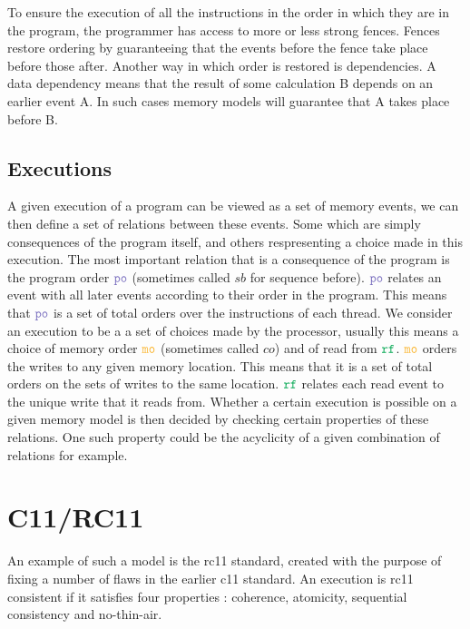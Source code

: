 \documentclass[a4,11pt,dvipsnames]{article}
\begin{document}
To ensure the execution of all the instructions in the order in which they are in the program, the programmer has access to more or less strong fences. Fences restore ordering by guaranteeing that the events before the fence take place before those after. Another way in which order is restored is dependencies. A data dependency means that the result of some calculation B depends on an earlier event A. In such cases memory models will guarantee that A takes place before B.%

\subsection{Executions}

A given execution of a program can be viewed as a set of memory events, we can then define a set of relations between these events. Some which are simply consequences of the program itself, and others respresenting a choice made in this execution. The most important relation that is a consequence of the program is the program order $\po$ (sometimes called $sb$ for sequence before). $\po$ relates an event with all later events according to their order in the program. This means that $\po$ is a set of total orders over the instructions of each thread. We consider an execution to be a a set of choices made by the processor, usually this means a choice of memory order $\mo$ (sometimes called $co$) and of read from $\rf$. $\mo$ orders the writes to any given memory location. This means that it is a set of total orders on the sets of writes to the same location. $\rf$ relates each read event to the unique write that it reads from. Whether a certain execution is possible on a given memory model is then decided by checking certain properties of these relations. One such property could be the acyclicity of a given combination of relations for example.

\vfill

\section{C11/RC11}

An example of such a model is the rc11 standard, created with the purpose of fixing a number of flaws in the earlier c11 standard. An execution is rc11 consistent if it satisfies four properties : coherence, atomicity, sequential consistency and no-thin-air. 
\end{document}
